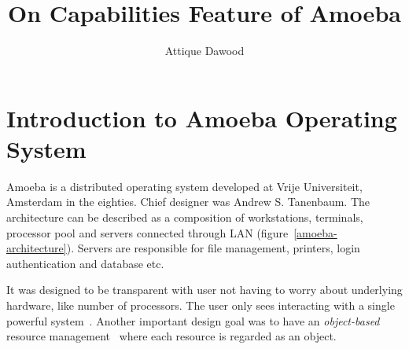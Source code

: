 \documentclass[11pt,a4paper]{article}
\begin{document}
\title{On Capabilities Feature of Amoeba}
\author{Attique Dawood}
\maketitle

\section{Introduction to Amoeba Operating System}

Amoeba is a distributed operating system developed at Vrije Universiteit, Amsterdam in the eighties. Chief designer was Andrew S. Tanenbaum. The architecture can be described as a composition of workstations, terminals, processor pool and servers connected through LAN (figure~\ref{amoeba-architecture}). Servers are responsible for file management, printers, login authentication and database etc.

It was designed to be transparent with user not having to worry about underlying hardware, like number of processors. The user only sees interacting with a single powerful system~\cite{amoeba-sourceforge}. Another important design goal was to have an \emph{object-based} resource management~\cite{distributed-systems-book} where each resource is regarded as an object.
\end{document}

